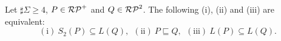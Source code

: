 \begin{thm}\label{補題21}
    Let $\sharp\Sigma \geq 4$, $P \in \mathcal{RP}^{+}$ and $Q \in \mathcal{RP}^{2}$.
    The following (i), (ii) and (iii) are equivalent:
    \[
        \mathrm{(i)}\ S_{2}(P) \subseteq L(Q),\ \
        \mathrm{(ii)}\ P \sqsubseteq Q, \ \
        \mathrm{(iii)}\ L(P) \subseteq L(Q).
    \]
\end{thm}







